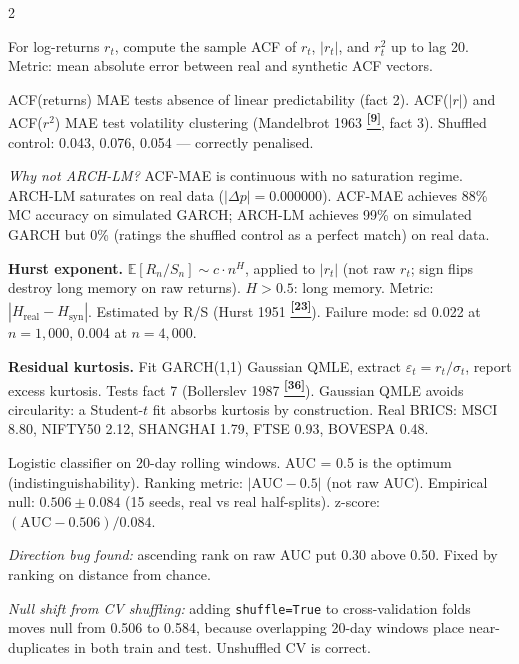 \documentclass[10pt]{article}
\newcommand{\navybox}[2]{\begin{tcolorbox}[mybox={Navy}{LBg},title={#1}]#2\end{tcolorbox}}
\newcommand{\tealbox}[2]{\begin{tcolorbox}[mybox={Teal}{LBg},title={#1}]#2\end{tcolorbox}}
\newcommand{\purplebox}[2]{\begin{tcolorbox}[mybox={Purple}{LBg},title={#1}]#2\end{tcolorbox}}
\newcommand{\tcite}[1]{%
  \hyperlink{R:#1}{\textsuperscript{\scriptsize\textbf{[#1]}}}}
\newcommand{\E}{\mathbb{E}}
\begin{document}
\begin{multicols}{2}
\columnbreak

\purplebox{Temporal Group: ACF-MAE Triple}{%
For log-returns $r_t$, compute the sample ACF of $r_t$, $|r_t|$, and $r_t^2$ up to lag 20. Metric: mean absolute error between real and synthetic ACF vectors.

ACF(returns) MAE tests absence of linear predictability (fact 2). ACF($|r|$) and ACF($r^2$) MAE test volatility clustering (Mandelbrot 1963\tcite{9}, fact 3). Shuffled control: 0.043, 0.076, 0.054 --- correctly penalised.

\textit{Why not ARCH-LM?} ACF-MAE is continuous with no saturation regime. ARCH-LM saturates on real data ($|\Delta p| = 0.000000$). ACF-MAE achieves 88\% MC accuracy on simulated GARCH; ARCH-LM achieves 99\% on simulated GARCH but 0\% (ratings the shuffled control as a perfect match) on real data.}

\navybox{Temporal Group: Hurst and Residual Kurtosis}{%
\textbf{Hurst exponent.} $\E[R_n/S_n] \sim c\cdot n^H$, applied to $|r_t|$ (not raw $r_t$; sign flips destroy long memory on raw returns). $H>0.5$: long memory. Metric: $|H_\text{real} - H_\text{syn}|$. Estimated by R/S (Hurst 1951\tcite{23}). Failure mode: sd 0.022 at $n=1{,}000$, 0.004 at $n=4{,}000$.

\textbf{Residual kurtosis.} Fit GARCH(1,1) Gaussian QMLE, extract $\varepsilon_t = r_t/\sigma_t$, report excess kurtosis. Tests fact 7 (Bollerslev 1987\tcite{36}). Gaussian QMLE avoids circularity: a Student-$t$ fit absorbs kurtosis by construction. Real BRICS: MSCI 8.80, NIFTY50 2.12, SHANGHAI 1.79, FTSE 0.93, BOVESPA 0.48.}

\tealbox{Temporal Group: Discriminative AUC}{%
Logistic classifier on 20-day rolling windows. AUC = 0.5 is the optimum (indistinguishability). Ranking metric: $|\text{AUC} - 0.5|$ (not raw AUC). Empirical null: $0.506 \pm 0.084$ (15 seeds, real vs real half-splits). z-score: $(\text{AUC} - 0.506)/0.084$.

\textit{Direction bug found:} ascending rank on raw AUC put 0.30 above 0.50. Fixed by ranking on distance from chance.

\textit{Null shift from CV shuffling:} adding \texttt{shuffle=True} to cross-validation folds moves null from 0.506 to 0.584, because overlapping 20-day windows place near-duplicates in both train and test. Unshuffled CV is correct.}

\end{multicols}
\end{document}

